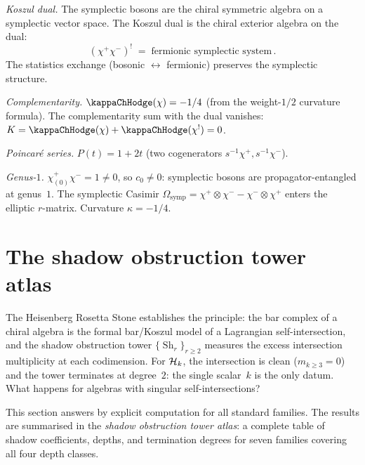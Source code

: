 \begin{computation}
\smallskip
\noindent
\emph{Koszul dual.}
The symplectic bosons are the chiral symmetric algebra on a
symplectic vector space. The Koszul dual is the chiral
exterior algebra on the dual:
\begin{equation}\label{eq:symplectic-boson-koszul}
(\chi^+\chi^-)^! \;=\; \text{fermionic symplectic system}\,.
\end{equation}
The statistics exchange (bosonic $\leftrightarrow$ fermionic)
preserves the symplectic structure.

\smallskip
\noindent
\emph{Complementarity.}
$\kappaChHodge(\chi) = -1/4$ (from the weight-$1/2$ curvature formula).
The complementarity sum with the dual vanishes:
$K = \kappaChHodge(\chi) + \kappaChHodge(\chi^!) = 0$.

\smallskip
\noindent
\emph{Poincar\'{e} series.}
$P(t) = 1 + 2t$ (two cogenerators $s^{-1}\chi^+, s^{-1}\chi^-$).

\smallskip
\noindent
\emph{Genus-$1$.}
$\chi^+_{(0)}\chi^- = 1 \ne 0$, so $c_0 \ne 0$: symplectic bosons
are propagator-entangled at genus~$1$. The symplectic Casimir
$\Omega_{\mathrm{symp}} = \chi^+ \otimes \chi^- - \chi^- \otimes \chi^+$
enters the elliptic $r$-matrix. Curvature $\kappa = -1/4$.
\end{computation}

\section{The shadow obstruction tower atlas}%
\label{sec:shadow-tower-atlas}%
%

The Heisenberg Rosetta Stone establishes the principle:
the bar complex of a chiral algebra is the formal bar/Koszul model of
a Lagrangian self-intersection, and the shadow obstruction tower
$\{\operatorname{Sh}_r\}_{r\ge 2}$ measures the excess
intersection multiplicity at each codimension. For
$\mathcal{H}_k$, the intersection is clean ($m_{k\ge 3}=0$) and the
tower terminates at degree~$2$: the single scalar~$k$ is the
only datum. What happens for algebras with singular
self-intersections?

This section answers by explicit computation for all
standard families. The results are summarised in the
\emph{shadow obstruction tower atlas}: a complete table of shadow
coefficients, depths, and termination degrees for seven
families covering all four depth classes.

